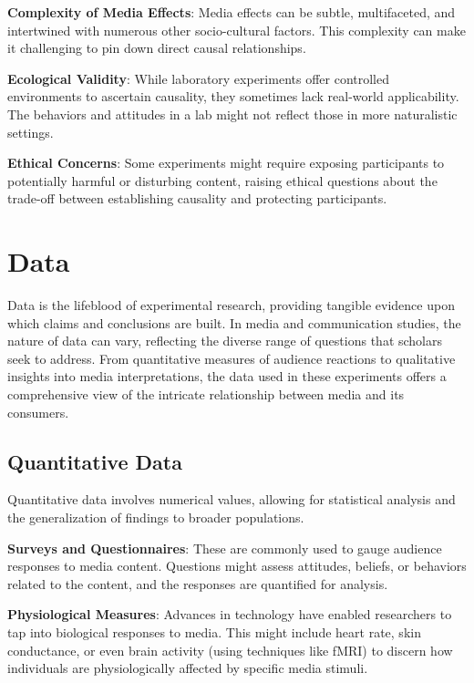 \documentclass[
  b5paper]{book}
\begin{document}
\textbf{Complexity of Media Effects}: Media effects can be subtle, multifaceted, and intertwined with numerous other socio-cultural factors. This complexity can make it challenging to pin down direct causal relationships.

\textbf{Ecological Validity}: While laboratory experiments offer controlled environments to ascertain causality, they sometimes lack real-world applicability. The behaviors and attitudes in a lab might not reflect those in more naturalistic settings.

\textbf{Ethical Concerns}: Some experiments might require exposing participants to potentially harmful or disturbing content, raising ethical questions about the trade-off between establishing causality and protecting participants.

\hypertarget{data}{%
\section{Data}\label{data}}

Data is the lifeblood of experimental research, providing tangible evidence upon which claims and conclusions are built. In media and communication studies, the nature of data can vary, reflecting the diverse range of questions that scholars seek to address. From quantitative measures of audience reactions to qualitative insights into media interpretations, the data used in these experiments offers a comprehensive view of the intricate relationship between media and its consumers.

\hypertarget{quantitative-data}{%
\subsection*{Quantitative Data}\label{quantitative-data}}

Quantitative data involves numerical values, allowing for statistical analysis and the generalization of findings to broader populations.

\textbf{Surveys and Questionnaires}: These are commonly used to gauge audience responses to media content. Questions might assess attitudes, beliefs, or behaviors related to the content, and the responses are quantified for analysis.

\textbf{Physiological Measures}: Advances in technology have enabled researchers to tap into biological responses to media. This might include heart rate, skin conductance, or even brain activity (using techniques like fMRI) to discern how individuals are physiologically affected by specific media stimuli.
\end{document}
